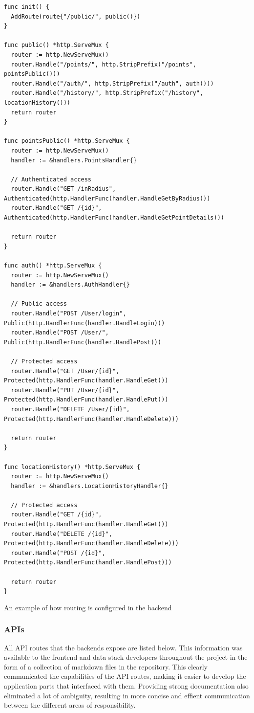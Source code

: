 \begin{listing}[htbp]
  \begin{verbatim}
func init() {
  AddRoute(route{"/public/", public()})
}

func public() *http.ServeMux {
  router := http.NewServeMux()
  router.Handle("/points/", http.StripPrefix("/points", pointsPublic()))
  router.Handle("/auth/", http.StripPrefix("/auth", auth()))
  router.Handle("/history/", http.StripPrefix("/history", locationHistory()))
  return router
}

func pointsPublic() *http.ServeMux {
  router := http.NewServeMux()
  handler := &handlers.PointsHandler{}

  // Authenticated access
  router.Handle("GET /inRadius", Authenticated(http.HandlerFunc(handler.HandleGetByRadius)))
  router.Handle("GET /{id}", Authenticated(http.HandlerFunc(handler.HandleGetPointDetails)))

  return router
}

func auth() *http.ServeMux {
  router := http.NewServeMux()
  handler := &handlers.AuthHandler{}

  // Public access
  router.Handle("POST /User/login", Public(http.HandlerFunc(handler.HandleLogin)))
  router.Handle("POST /User/", Public(http.HandlerFunc(handler.HandlePost)))

  // Protected access
  router.Handle("GET /User/{id}", Protected(http.HandlerFunc(handler.HandleGet)))
  router.Handle("PUT /User/{id}", Protected(http.HandlerFunc(handler.HandlePut)))
  router.Handle("DELETE /User/{id}", Protected(http.HandlerFunc(handler.HandleDelete)))

  return router
}

func locationHistory() *http.ServeMux {
  router := http.NewServeMux()
  handler := &handlers.LocationHistoryHandler{}

  // Protected access
  router.Handle("GET /{id}", Protected(http.HandlerFunc(handler.HandleGet)))
  router.Handle("DELETE /{id}", Protected(http.HandlerFunc(handler.HandleDelete)))
  router.Handle("POST /{id}", Protected(http.HandlerFunc(handler.HandlePost)))

  return router
}
  \end{verbatim}
  \caption{An example of how routing is configured in the backend}
  \label{listing:routing_example}
\end{listing}

\subsubsection{APIs}
All API routes that the backends expose are listed below. This information was
available to the frontend and data stack developers throughout the project in
the form of a collection of markdown files in the repository. This clearly
communicated the capabilities of the API routes, making it easier to develop the
application parts that interfaced with them. Providing strong documentation also
eliminated a lot of ambiguity, resulting in more concise and effient
communication between the different areas of responsibility.

